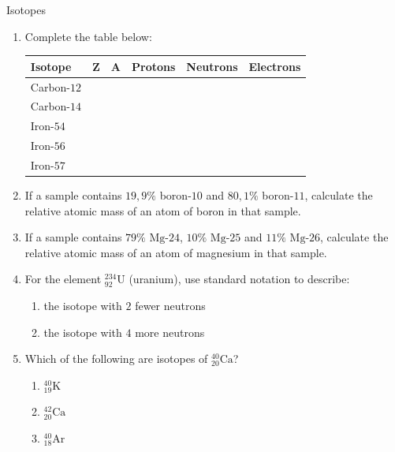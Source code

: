 \begin{exercises}  {Isotopes }
\begin{enumerate}[noitemsep, label=\textbf{\arabic*}. ]
\begin{enumerate}[noitemsep, label=\textbf{\alph*}. ]
\label{m38753*uid66}\item $_{90}^{238}\text{E}$
\label{m38753*uid67}\item $_{92}^{235}\text{E}$
\end{enumerate}
            \label{m38753*uid619}\item Complete the table below:
          \begin{center}
\begin{tabular}{|p{2cm}|p{1cm}|p{1cm}|p{1.4cm}|p{1.4cm}|p{1.4cm}|}\hline
\textbf{Isotope} & \textbf{Z} & \textbf{A} & \textbf{Protons} & \textbf{Neutrons} & \textbf{Electrons}\\\hline
Carbon-$12$ & & & & & \\\hline
Carbon-$14$ & & & & & \\\hline
Iron-$54$ & & & & & \\\hline
Iron-$56$ & & & & & \\\hline
Iron-$57$ & & & & & \\ \hline
\end{tabular}
\end{center}
\item If a sample contains $19,9\%$ boron-$10$ and $80,1\%$ boron-$11$, calculate the relative atomic mass of an atom of boron in that sample.
\hspace{1ex}    
\label{m38753*uid7100}\item If a sample contains $79\% \text{ Mg-}24$, $10\% \text{ Mg-}25$ and $11\% \text{ Mg-}26$, calculate the relative atomic mass of an atom of magnesium in that sample.
\item For the element $^{234}_{92}{\text{U}}$ (uranium), use standard notation to describe:
\begin{enumerate}[noitemsep, label=\textbf{\alph*}. ]
 \item the isotope with $2$ fewer neutrons
 \item the isotope with $4$ more neutrons
\end{enumerate}
\item Which of the following are isotopes of $^{40}_{20}\text{Ca}$?
\begin{enumerate}[noitemsep, label=\textbf{\alph*}. ]
 \item $^{40}_{19}\text{K}$
 \item $^{42}_{20}\text{Ca}$
 \item $^{40}_{18}\text{Ar}$
\end{enumerate}

\end{enumerate}
\end{exercises}
